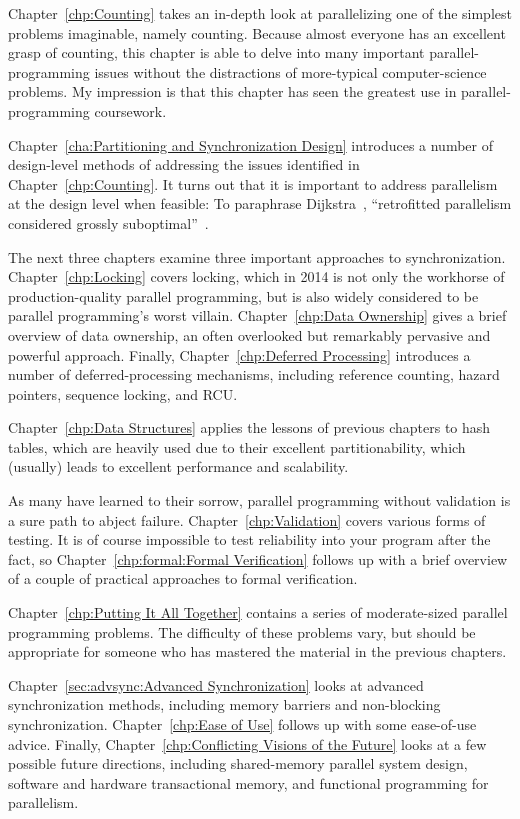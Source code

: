 Chapter~\ref{chp:Counting} takes an in-depth look at parallelizing
one of the simplest problems imaginable, namely counting.
Because almost everyone has an excellent grasp of counting, this chapter
is able to delve into many important parallel-programming issues without
the distractions of more-typical computer-science problems.
My impression is that this chapter has seen the greatest use in
parallel-programming coursework.

Chapter~\ref{cha:Partitioning and Synchronization Design}
introduces a number of design-level methods of addressing the issues
identified in Chapter~\ref{chp:Counting}.
It turns out that it is important to address parallelism at
the design level when feasible:
To paraphrase Dijkstra~\cite{Dijkstra:1968:LEG:362929.362947},
``retrofitted parallelism considered grossly
suboptimal''~\cite{PaulEMcKenney2012HOTPARsuboptimal}.

The next three chapters examine three important approaches to
synchronization.
Chapter~\ref{chp:Locking} covers locking, which in 2014 is not only the
workhorse of production-quality parallel programming, but is also widely
considered to be parallel programming's worst villain.
Chapter~\ref{chp:Data Ownership} gives a brief overview of data ownership,
an often overlooked but remarkably pervasive and powerful approach.
Finally, Chapter~\ref{chp:Deferred Processing} introduces a number of
deferred-processing mechanisms, including reference counting,
hazard pointers, sequence locking, and RCU.

Chapter~\ref{chp:Data Structures} applies the lessons of previous
chapters to hash tables, which are heavily used due
to their excellent partitionability, which (usually) leads to excellent
performance and scalability.

As many have learned to their sorrow, parallel programming without
validation is a sure path to abject failure.
Chapter~\ref{chp:Validation} covers various forms of testing.
It is of course impossible to test reliability into your program
after the fact, so Chapter~\ref{chp:formal:Formal Verification}
follows up with a brief overview of a couple of practical approaches to
formal verification.

Chapter~\ref{chp:Putting It All Together}
contains a series of moderate-sized parallel programming problems.
The difficulty of these problems vary, but should be appropriate for
someone who has mastered the material in the previous chapters.

Chapter~\ref{sec:advsync:Advanced Synchronization}
looks at advanced synchronization methods, including memory barriers
and non-blocking synchronization.
Chapter~\ref{chp:Ease of Use} follows up with some ease-of-use advice.
Finally, Chapter~\ref{chp:Conflicting Visions of the Future}
looks at a few possible future directions, including
shared-memory parallel system design, software and hardware transactional
memory, and functional programming for parallelism.

